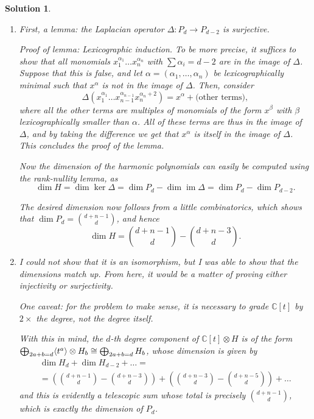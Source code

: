 \documentclass{article}
\theoremstyle{nonumberplain}
\newtheorem{sol}{Solution}
\newcommand{\C}{\mathbb{C}}
\DeclareMathOperator{\image}{im}
\DeclarePairedDelimiter{\braket}{\langle}{\rangle}
\begin{document}
\begin{sol}
\leavevmode
\begin{enumerate}
\item First, a lemma: the Laplacian operator $\Delta \colon P_d \to P_{d-2}$ is surjective.

Proof of lemma: Lexicographic induction. To be more precise, it suffices to show that all monomials $x_1^{\alpha_1} \dots x_n^{\alpha_n}$ with $\sum \alpha_i = d-2$ are in the image of $\Delta$. Suppose that this is false, and let $\alpha = (\alpha_1, \dots, \alpha_n)$ be lexicographically minimal such that $x^\alpha$ is not in the image of $\Delta$. Then, consider
\begin{equation}
\Delta(x_1^{\alpha_1} \dots x_{n-1}^{\alpha_{n-1}} x_n^{\alpha_n + 2}) = x^\alpha + \text{(other terms)},
\end{equation}
where all the other terms are multiples of monomials of the form $x^\beta$ with $\beta$ lexicographically smaller than $\alpha$. All of these terms are thus in the image of $\Delta$, and by taking the difference we get that $x^\alpha$ is itself in the image of $\Delta$. This concludes the proof of the lemma.

Now the dimension of the harmonic polynomials can easily be computed using the rank-nullity lemma, as
\begin{equation}
\dim H = \dim \ker \Delta = \dim P_d - \dim \image \Delta = \dim P_d - \dim P_{d-2}.
\end{equation}

The desired dimension now follows from a little combinatorics, which shows that $\dim P_d = \binom{d+n-1}d$, and hence
\begin{equation}
\dim H = \binom{d+n-1}d - \binom{d+n-3}d.
\end{equation}

\item I could not show that it is an isomorphism, but I was able to show that the dimensions match up. From here, it would be a matter of proving either injectivity or surjectivity.

One caveat: for the problem to make sense, it is necessary to grade $\C[t]$ by $2\times$ the degree, not the degree itself.

With this in mind, the $d$-th degree component of $\C[t] \otimes H$ is of the form $\bigoplus_{2a + b = d} \braket{t^{a}} \otimes H_b \cong \bigoplus_{2a+b=d} H_b$, whose dimension is given by
\begin{multline}
\dim H_d + \dim H_{d-2} + \dots =\\
= \left(\binom{d+n-1}d - \binom{d+n-3}d\right) + \left(\binom{d+n-3}d - \binom{d+n-5}d\right) + \dots
\end{multline}
and this is evidently a telescopic sum whose total is precisely $\binom{d+n-1}d$, which is exactly the dimension of $P_d$.


\end{enumerate}
\end{sol}
\end{document}
